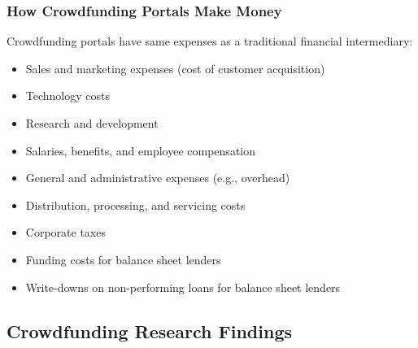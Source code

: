 \documentclass[aspectratio=169,xcolor=dvipsnames]{beamer}
\begin{document}
\begin{frame}
\frametitle{How Crowdfunding Portals Make Money}


Crowdfunding portals have same expenses as a traditional financial intermediary:
\begin{itemize}
    \item Sales and marketing expenses (cost of customer acquisition)
    \item Technology costs
    \item Research and development
    \item Salaries, benefits, and employee compensation
    \item General and administrative expenses (e.g., overhead)
    \item Distribution, processing, and servicing costs
    \item Corporate taxes
    \item Funding costs for balance sheet lenders
    \item Write-downs on non-performing loans for balance sheet lenders
\end{itemize}



\end{frame} 





\subsection{Crowdfunding Research Findings}
\end{document}

